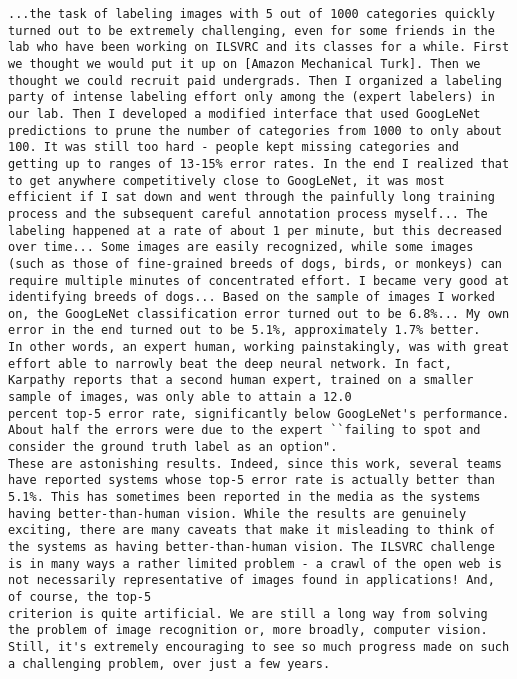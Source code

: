 \begin{lstlisting}
...the task of labeling images with 5 out of 1000 categories quickly turned out to be extremely challenging, even for some friends in the lab who have been working on ILSVRC and its classes for a while. First we thought we would put it up on [Amazon Mechanical Turk]. Then we thought we could recruit paid undergrads. Then I organized a labeling party of intense labeling effort only among the (expert labelers) in our lab. Then I developed a modified interface that used GoogLeNet predictions to prune the number of categories from 1000 to only about 100. It was still too hard - people kept missing categories and getting up to ranges of 13-15% error rates. In the end I realized that to get anywhere competitively close to GoogLeNet, it was most efficient if I sat down and went through the painfully long training process and the subsequent careful annotation process myself... The labeling happened at a rate of about 1 per minute, but this decreased over time... Some images are easily recognized, while some images (such as those of fine-grained breeds of dogs, birds, or monkeys) can require multiple minutes of concentrated effort. I became very good at identifying breeds of dogs... Based on the sample of images I worked on, the GoogLeNet classification error turned out to be 6.8%... My own error in the end turned out to be 5.1%, approximately 1.7% better. 
In other words, an expert human, working painstakingly, was with great effort able to narrowly beat the deep neural network. In fact, Karpathy reports that a second human expert, trained on a smaller sample of images, was only able to attain a 12.0
percent top-5 error rate, significantly below GoogLeNet's performance. About half the errors were due to the expert ``failing to spot and consider the ground truth label as an option".
These are astonishing results. Indeed, since this work, several teams have reported systems whose top-5 error rate is actually better than 5.1%. This has sometimes been reported in the media as the systems having better-than-human vision. While the results are genuinely exciting, there are many caveats that make it misleading to think of the systems as having better-than-human vision. The ILSVRC challenge is in many ways a rather limited problem - a crawl of the open web is not necessarily representative of images found in applications! And, of course, the top-5
criterion is quite artificial. We are still a long way from solving the problem of image recognition or, more broadly, computer vision. Still, it's extremely encouraging to see so much progress made on such a challenging problem, over just a few years.

\end{lstlisting}
